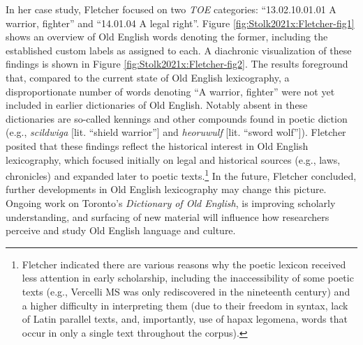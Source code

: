 In her case study, Fletcher focused on two \textit{TOE} categories: ``13.02.10.01.01 A warrior, fighter'' and ``14.01.04 A legal right''. Figure \ref{fig:Stolk2021x:Fletcher-fig1} shows an overview of Old English words denoting the former, including the established custom labels as assigned to each. A diachronic visualization of these findings is shown in Figure \ref{fig:Stolk2021x:Fletcher-fig2}. 
The results foreground that, compared to the current state of Old English lexicography, a disproportionate number of words denoting ``A warrior, fighter'' were not yet included in earlier dictionaries of Old English. Notably absent in these dictionaries are so-called kennings and other compounds found in poetic diction (e.g., \textit{scildwiga} [lit. ``shield warrior''] and \textit{heoruwulf} [lit. ``sword wolf'']). Fletcher posited that these findings reflect the historical interest in Old English lexicography, which focused initially on legal and historical sources (e.g., laws, chronicles) and expanded later to poetic texts.\footnote{Fletcher indicated there are various reasons why the poetic lexicon received less attention in early scholarship, including the inaccessibility of some poetic texts (e.g., Vercelli MS was only rediscovered in the nineteenth century) and a higher difficulty in interpreting them (due to their freedom in syntax, lack of Latin parallel texts, and, importantly, use of hapax legomena, words that occur in only a single text throughout the corpus).} %
In the future, Fletcher concluded, further developments in Old English lexicography may change this picture. Ongoing work on Toronto's \textit{Dictionary of Old English}, is improving scholarly understanding, and surfacing of new material will influence how researchers perceive and study Old English language and culture. %

